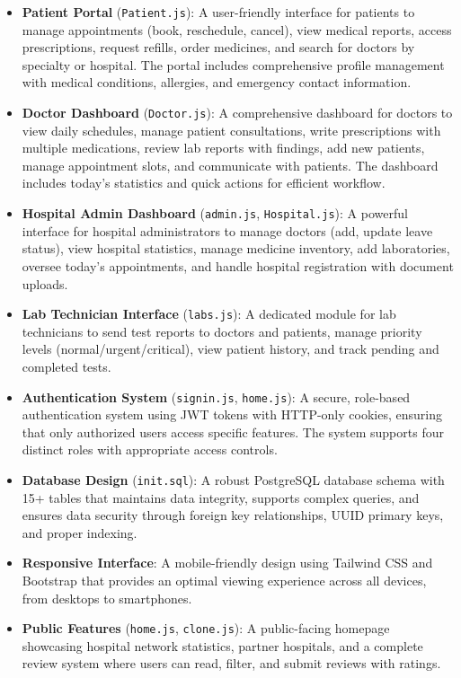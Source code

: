 \begin{itemize}
    \item \textbf{Patient Portal} (\texttt{Patient.js}): A user-friendly interface for patients to manage appointments (book, reschedule, cancel), view medical reports, access prescriptions, request refills, order medicines, and search for doctors by specialty or hospital. The portal includes comprehensive profile management with medical conditions, allergies, and emergency contact information.
    
    \item \textbf{Doctor Dashboard} (\texttt{Doctor.js}): A comprehensive dashboard for doctors to view daily schedules, manage patient consultations, write prescriptions with multiple medications, review lab reports with findings, add new patients, manage appointment slots, and communicate with patients. The dashboard includes today's statistics and quick actions for efficient workflow.
    
    \item \textbf{Hospital Admin Dashboard} (\texttt{admin.js}, \texttt{Hospital.js}): A powerful interface for hospital administrators to manage doctors (add, update leave status), view hospital statistics, manage medicine inventory, add laboratories, oversee today's appointments, and handle hospital registration with document uploads.
    
    \item \textbf{Lab Technician Interface} (\texttt{labs.js}): A dedicated module for lab technicians to send test reports to doctors and patients, manage priority levels (normal/urgent/critical), view patient history, and track pending and completed tests.
    
    \item \textbf{Authentication System} (\texttt{signin.js}, \texttt{home.js}): A secure, role-based authentication system using JWT tokens with HTTP-only cookies, ensuring that only authorized users access specific features. The system supports four distinct roles with appropriate access controls.
    
    \item \textbf{Database Design} (\texttt{init.sql}): A robust PostgreSQL database schema with 15+ tables that maintains data integrity, supports complex queries, and ensures data security through foreign key relationships, UUID primary keys, and proper indexing.
    
    \item \textbf{Responsive Interface}: A mobile-friendly design using Tailwind CSS and Bootstrap that provides an optimal viewing experience across all devices, from desktops to smartphones.
    
    \item \textbf{Public Features} (\texttt{home.js}, \texttt{clone.js}): A public-facing homepage showcasing hospital network statistics, partner hospitals, and a complete review system where users can read, filter, and submit reviews with ratings.
\end{itemize}

